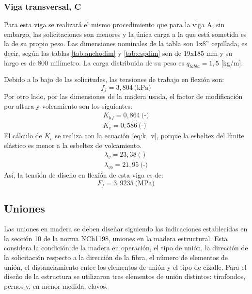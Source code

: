 \subsubsection{Viga transversal, C}
Para esta viga se realizará el mismo procedimiento que para la viga A, sin embargo, las solicitaciones son menores y la única carga a la que está sometida es la de su propio peso. Las dimensiones nominales de la tabla son 1x8'' cepillada, es decir, según las tablas \ref{tab:anchodim} y \ref{tab:espdim} son de 19x185 mm y su largo es de 800 milímetro. La carga distribuida de su peso es $q_{tabla}=1,5$ [kg/m].

Debido a lo bajo de las solicitudes, las tensiones de trabajo en flexión son:
\begin{equation}
	f_f = 3,804 \: \text{(kPa)} 
\end{equation}
Por otro lado, por las dimensiones de la madera usada, el factor de modificación por altura y volcamiento son los siguientes:
\begin{gather*}
	K_{hf} = 0,864\: \text{(-)}\\
	K_{v} = 0,586\: \text{(-)}
\end{gather*}
El cálculo de $K_v$ se realiza con la ecuación \ref{eq:k_v}, porque la esbeltez del límite elástico es menor a la esbeltez de volcamiento.
\begin{gather*}
	\lambda_v = 23,38 \: \text{(-)}\\
	\lambda_{vo} = 21,95 \: \text{(-)}
\end{gather*}
Así, la tensión de diseño en flexión de esta viga es de:
\begin{equation}
	F_f = 3,9235 \: \text{(MPa)}
\end{equation}

\subsection{Uniones}
Las uniones en madera se deben diseñar siguiendo las indicaciones establecidas en la sección 10 de la norma NCh1198, uniones en la madera estructural. Esta considera la condición de la madera en operación, el tipo de unión, la dirección de la solicitación respecto a la dirección de la fibra, el número de elementos de unión, el distanciamiento entre los elementos de unión y el tipo de cizalle. Para el diseño de la estructura se utilizaron tres elementos de unión distintos: tirafondos, pernos y, en menor medida, clavos.

